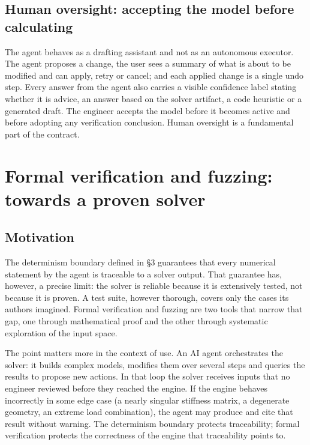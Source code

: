 \documentclass[11pt,a4paper]{article}
\begin{document}
\subsection{Human oversight: accepting the model before calculating}\label{sec:3.3}

The agent behaves as a drafting assistant and not as an autonomous executor. The agent proposes a change, the user sees a summary of what is about to be modified and can apply, retry or cancel; and each applied change is a single undo step. Every answer from the agent also carries a visible confidence label stating whether it is advice, an answer based on the solver artifact, a code heuristic or a generated draft. The engineer accepts the model before it becomes active and before adopting any verification conclusion. Human oversight is a fundamental part of the contract.

\section{Formal verification and fuzzing: towards a proven solver}\label{sec:4}

\subsection{Motivation}\label{sec:4.1}

The determinism boundary defined in §3 guarantees that every numerical statement by the agent is traceable to a solver output. That guarantee has, however, a precise limit: the solver is reliable because it is extensively tested, not because it is proven. A test suite, however thorough, covers only the cases its authors imagined. Formal verification and fuzzing are two tools that narrow that gap, one through mathematical proof and the other through systematic exploration of the input space.

The point matters more in the context of use. An AI agent orchestrates the solver: it builds complex models, modifies them over several steps and queries the results to propose new actions. In that loop the solver receives inputs that no engineer reviewed before they reached the engine. If the engine behaves incorrectly in some edge case (a nearly singular stiffness matrix, a degenerate geometry, an extreme load combination), the agent may produce and cite that result without warning. The determinism boundary protects traceability; formal verification protects the correctness of the engine that traceability points to.
\end{document}
